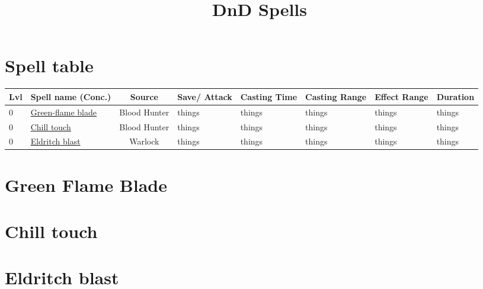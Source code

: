 \documentclass{article}
\title{DnD Spells}
\begin{document}
\section{Spell table}

\begin{tabular}{|l|p{9em}|c|p{4em}|p{3em}|p{3em}|l|l|}
\rowcolor{gray!50}
     Lvl & Spell name (Conc.) & Source & Save/ Attack & Casting Time & Casting Range & Effect Range & Duration \\
     \hline\hline
     0 & \hyperref[sec:GreenFlameBlade]{Green-flame blade}& Blood Hunter & things & things & things & things & things\\
     0 & \hyperref[sec:ChillTouch]{Chill touch}& Blood Hunter & things & things & things & things & things\\
     0 & \hyperref[sec:EldritchBlast]{Eldritch blast}& Warlock & things & things & things & things & things \\
    
\hline
\end{tabular}

\newpage
\twocolumn
\section{Green Flame Blade}
\label{sec:GreenFlameBlade}

\section{Chill touch}
\label{sec:ChillTouch}

\section{Eldritch blast}
\label{sec:EldritchBlast}
\end{document}
